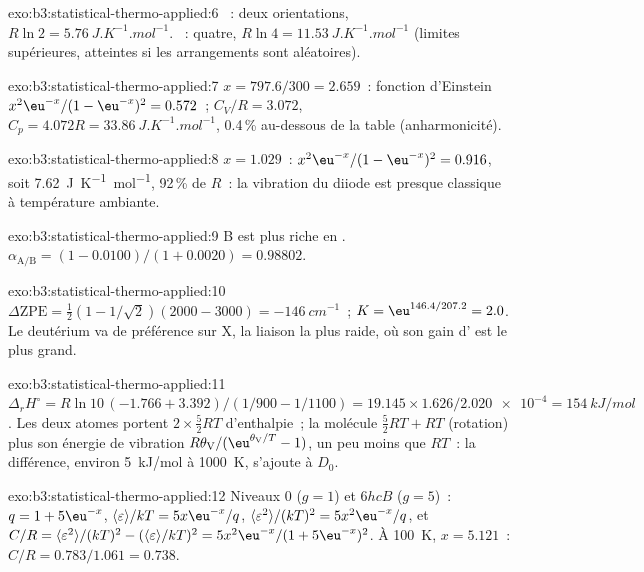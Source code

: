 \begin{solution}{exo:b3:statistical-thermo-applied:6}
~: deux orientations, $R\ln2 = \qty{5.76}{J.K^{-1}.mol^{-1}}$.
~: quatre, $R\ln4 =
\qty{11.53}{J.K^{-1}.mol^{-1}}$ (limites supérieures, atteintes si les
arrangements sont aléatoires).
\end{solution}

\begin{solution}{exo:b3:statistical-thermo-applied:7}
$x = 797.6/300 = 2.659$~: fonction d'Einstein $x^2\eu^{-x}/(1 - \eu^{-x})^2 = 0.572$~; $C_V/R = 3.072$,
$C_p = 4.072R = \qty{33.86}{J.K^{-1}.mol^{-1}}$, 0.4\,\% au-dessous de la
table (anharmonicité).
\end{solution}

\begin{solution}{exo:b3:statistical-thermo-applied:8}
$x = 1.029$~: $x^2\eu^{-x}/(1 - \eu^{-x})^2 = 0.916$, soit
\qty{7.62}{J.K^{-1}.mol^{-1}}, 92\,\% de $R$~: la
vibration du diiode est presque classique à température ambiante.
\end{solution}

\begin{solution}{exo:b3:statistical-thermo-applied:9}
B est plus riche en . $\alpha_{\mathrm{A/B}} = (1 - 0.0100)/(1 + 0.0020) = 0.98802$.
\end{solution}

\begin{solution}{exo:b3:statistical-thermo-applied:10}
$\Delta\mathrm{ZPE} = \frac12(1 - 1/\sqrt2)(2000 - 3000) = \qty{-146}{cm^{-1}}$~; $K = \eu^{146.4/207.2} = 2.0$.
Le deutérium va de préférence sur X, la liaison la plus raide, où son
gain d' est le plus grand.
\end{solution}

\begin{solution}{exo:b3:statistical-thermo-applied:11}
$\Delta_rH^\circ = R\ln10\,(-1.766 + 3.392)/(1/900 - 1/1100) = 19.145 \times 1.626/\num{2.020e-4} =
\qty{154}{kJ/mol}$. Les deux atomes portent $2 \times \frac52RT$
d'enthalpie~; la molécule $\frac52RT + RT$
(rotation) plus son énergie de vibration $R\theta_{\mathrm V}/(\eu^{\theta_{\mathrm V}/T} - 1)$,
un peu moins que $RT$~:
la différence, environ \qty{5}{kJ/mol} à \qty{1000}{K}, s'ajoute à $D_0$.
\end{solution}

\begin{solution}{exo:b3:statistical-thermo-applied:12}
Niveaux 0 ($g = 1$) et $6hcB$ ($g = 5$)~: $q = 1 + 5\eu^{-x}$, $\langle\varepsilon\rangle/kT = 5x\eu^{-x}/q$, $\langle\varepsilon^2\rangle/(kT)^2 =
5x^2\eu^{-x}/q$, et $C/R = \langle\varepsilon^2\rangle/(kT)^2 - (\langle\varepsilon\rangle/kT)^2 = 5x^2\eu^{-x}/(1 + 5\eu^{-x})^2$.
À \qty{100}{K}, $x = 5.121$~: $C/R = 0.783/1.061 = 0.738$.
\end{solution}


